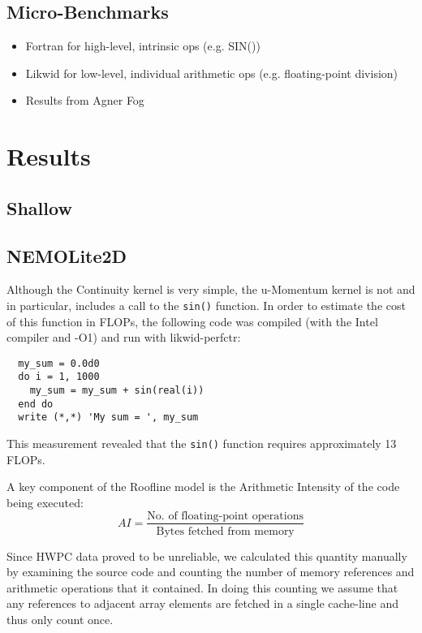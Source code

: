 \documentclass[12pt]{article}
\begin{document}
\subsection{Micro-Benchmarks}

\begin{itemize}
\item Fortran for high-level, intrinsic ops (e.g. SIN())
\item Likwid for low-level, individual arithmetic ops (e.g. floating-point division)
\item Results from Agner Fog
\end{itemize}

\section{Results}

\subsection{Shallow}

\subsection{NEMOLite2D}

Although the Continuity kernel is very simple, the u-Momentum kernel
is not and in particular, includes a call to the {\tt sin()} function.
In order to estimate the cost of this function in FLOPs, the following
code was compiled (with the Intel compiler and -O1) and run with
likwid-perfctr:
\begin{verbatim}
  my_sum = 0.0d0
  do i = 1, 1000
    my_sum = my_sum + sin(real(i))
  end do
  write (*,*) 'My sum = ', my_sum
\end{verbatim}
This measurement revealed that the {\tt sin()} function requires
approximately 13 FLOPs.

A key component of the Roofline model is the Arithmetic Intensity of
the code being executed:
\begin{equation}
AI = \frac{\textrm{No. of floating-point operations}}{\textrm{Bytes fetched from memory}}
\end{equation}

Since HWPC data proved to be unreliable, we calculated this quantity
manually by examining the source code and counting the number of
memory references and arithmetic operations that it contained. In
doing this counting we assume that any references to adjacent array
elements are fetched in a single cache-line and thus only count once.
\end{document}
